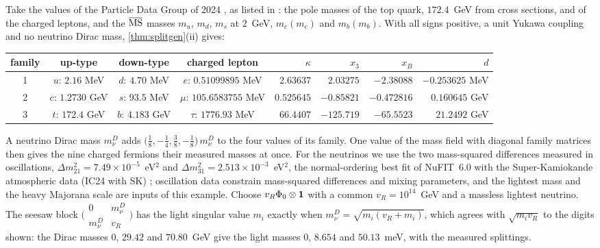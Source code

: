 \begin{example}
\label{ex:observed}
Take the values of the Particle Data Group of 2024 \cite{PDG2024}, as listed in \cite[eq.~(2.2)]{AntuschHinzeSaad2025}: the pole masses of the top
quark, $172.4$~GeV from cross sections, and of the charged leptons, and the $\overline{\rm MS}$ masses $m_u$, $m_d$, $m_s$ at $2$~GeV,
$m_c(m_c)$ and $m_b(m_b)$. With all signs positive, a unit Yukawa coupling and no neutrino Dirac mass, \cref{thm:splitgen}(ii) gives:
\begin{center}
\footnotesize\setlength{\tabcolsep}{3.5pt}
\begin{tabular}{@{}cccc|rrrr@{}}
\toprule
family & up-type & down-type & charged lepton & $\kappa$ & $x_3$ & $x_B$ & $d$\\
\midrule
1 & $u$: $2.16$ MeV & $d$: $4.70$ MeV & $e$: $0.51099895$ MeV & $2.63637$ & $2.03275$ & $-2.38088$ & $-0.253625$ MeV\\
2 & $c$: $1.2730$ GeV & $s$: $93.5$ MeV & $\mu$: $105.6583755$ MeV & $0.525645$ & $-0.85821$ & $-0.472816$ & $0.160645$ GeV\\
3 & $t$: $172.4$ GeV & $b$: $4.183$ GeV & $\tau$: $1776.93$ MeV & $66.4407$ & $-125.719$ & $-65.5523$ & $21.2492$ GeV\\
\bottomrule
\end{tabular}
\end{center}
A neutrino Dirac mass $m_\nu^D$ adds $\bigl(\tfrac18,-\tfrac14,\tfrac38,-\tfrac18\bigr)\,m_\nu^D$ to the four values of its family. One value of
the mass field with diagonal family matrices then gives the nine charged fermions their measured masses at once. For the neutrinos we use the two
mass-squared differences measured in oscillations, $\Delta m^2_{21}=7.49\times10^{-5}$~eV$^2$ and $\Delta m^2_{31}=2.513\times10^{-3}$~eV$^2$,
the normal-ordering best fit of NuFIT~6.0 with the Super-Kamiokande atmospheric data (IC24 with SK) \cite[Table~1]{NuFIT6}; oscillation data
constrain mass-squared differences and mixing parameters, and the lightest mass and the heavy Majorana scale are inputs of this example. Choose $v_R\Phi_0\otimes\mathbf 1$ with a common $v_R=10^{14}$~GeV and a massless lightest neutrino. The seesaw block
$\bigl(\begin{smallmatrix}0&m_\nu^D\\m_\nu^D&v_R\end{smallmatrix}\bigr)$ has the light singular value $m_i$ exactly when
$m_\nu^D=\sqrt{m_i(v_R+m_i)}$, which agrees with $\sqrt{m_iv_R}$ to the digits shown: the Dirac masses $0$, $29.42$ and $70.80$~GeV give the
light masses $0$, $8.654$ and $50.13$~meV, with the measured splittings.
\end{example}

